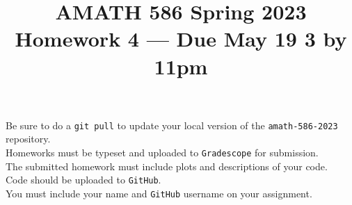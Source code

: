 \documentclass[10pt]{amsart}
\begin{document}
\pagestyle{empty}

\newcommand{\mline}{\vspace{.2in}\hrule\vspace{.2in}}


\title{\bf { AMATH 586 Spring 2023 \\ Homework 4 ---
Due May 19 3 by 11pm} }
\maketitle
\begin{center} Be sure to do a {\tt git pull} to update your local
  version of the {\tt amath-586-2023} repository.\\  Homeworks must be
  typeset and uploaded to {\tt Gradescope} for submission.\\
  The submitted homework must include plots and descriptions of your code.\\
  Code should be uploaded to {\tt GitHub}.\\
  You must include your name and {\tt GitHub} username on your assignment.
  \end{center}
\end{document}
